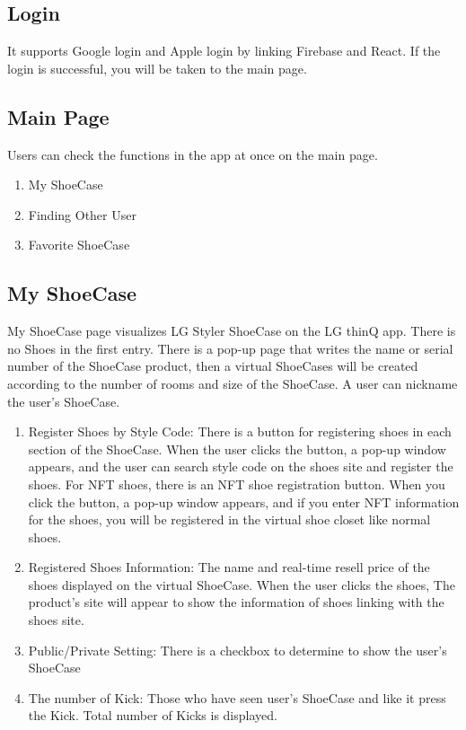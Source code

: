 \documentclass[conference]{IEEEtran}
\begin{document}
\subsection{Login}
It supports Google login and Apple login by linking Firebase and React. If the login is successful, you will be taken to the main page.\\

\subsection{Main Page}
Users can check the functions in the app at once on the main page. \\
\begin{enumerate}
    \item My ShoeCase\\
    \item Finding Other User\\
    \item Favorite ShoeCase\\
\end{enumerate}

\subsection{My ShoeCase}
My ShoeCase page visualizes LG Styler ShoeCase on the LG thinQ app. There is no Shoes in the first entry. There is a pop-up page that writes the name or serial number of the ShoeCase product, then a virtual ShoeCases will be created according to the number of rooms and size of the ShoeCase. A user can nickname the user's ShoeCase.
\\
\begin{enumerate}
    \item Register Shoes by Style Code: There is a button for registering shoes in each section of the ShoeCase. When the user clicks the button, a pop-up window appears, and the user can search style code on the shoes site and register the shoes. For NFT shoes, there is an NFT shoe registration button. When you click the button, a pop-up window appears, and if you enter NFT information for the shoes, you will be registered in the virtual shoe closet like normal shoes.
\\
    \item Registered Shoes Information: The name and real-time resell price of the shoes displayed on the virtual ShoeCase. When the user clicks the shoes, The product’s site will appear to show the information of shoes linking with the shoes site.
\\
    \item Public/Private Setting: There is a checkbox to determine to show the user's ShoeCase
\\
    \item The number of Kick: Those who have seen user's ShoeCase and like it press the Kick. Total number of Kicks is displayed.
\\
\end{enumerate}
\end{document}
